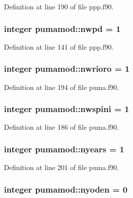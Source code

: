 \-Definition at line 190 of file ppp.\-f90.

\hypertarget{classpumamod_a0b0e7fc78c5ac39d54ce42a9902447a8}{
\subsubsection[{nwpd}]{\setlength{\rightskip}{0pt plus 5cm}integer {\bf pumamod\-::nwpd} = 1}}
\label{classpumamod_a0b0e7fc78c5ac39d54ce42a9902447a8}


\-Definition at line 141 of file ppp.\-f90.

\hypertarget{classpumamod_aeed68a00c7949544bc4fef6fb12750e7}{
\subsubsection[{nwrioro}]{\setlength{\rightskip}{0pt plus 5cm}integer {\bf pumamod\-::nwrioro} = 1}}
\label{classpumamod_aeed68a00c7949544bc4fef6fb12750e7}


\-Definition at line 194 of file puma.\-f90.

\hypertarget{classpumamod_ae565fd4c9d0d1e8f563b457690df60e1}{
\subsubsection[{nwspini}]{\setlength{\rightskip}{0pt plus 5cm}integer {\bf pumamod\-::nwspini} = 1}}
\label{classpumamod_ae565fd4c9d0d1e8f563b457690df60e1}


\-Definition at line 186 of file puma.\-f90.

\hypertarget{classpumamod_a6bebc837456862a7db9c50bcd686e1e6}{
\subsubsection[{nyears}]{\setlength{\rightskip}{0pt plus 5cm}integer {\bf pumamod\-::nyears} = 1}}
\label{classpumamod_a6bebc837456862a7db9c50bcd686e1e6}


\-Definition at line 201 of file puma.\-f90.

\hypertarget{classpumamod_ab503ecf77d192f1191181556fa21346e}{
\subsubsection[{nyoden}]{\setlength{\rightskip}{0pt plus 5cm}integer {\bf pumamod\-::nyoden} = 0}}
\label{classpumamod_ab503ecf77d192f1191181556fa21346e}


